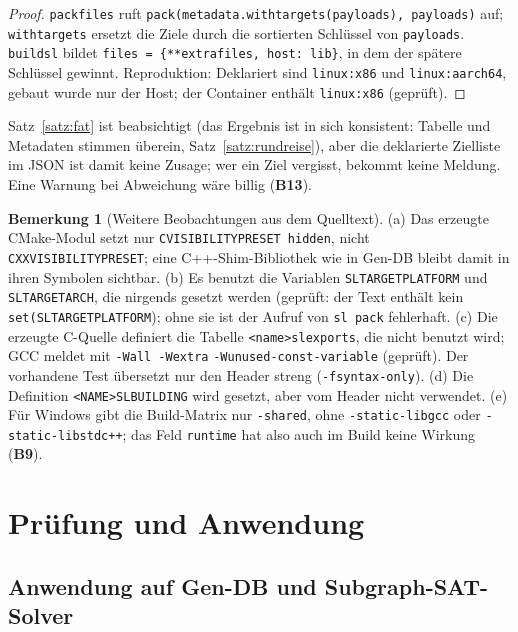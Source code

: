 \documentclass[a4paper,12pt,twoside]{report}
\DeclareRobustCommand{\_}{\ifmmode\mbox{\textunderscore}\else\textunderscore\allowbreak{}\fi}
\theoremstyle{definition}
\newtheorem{bemerkung}{Bemerkung}[chapter]
\newcommand{\Bf}[1]{\textbf{B#1}}
\begin{document}
\begin{proof}
	\texttt{pack\_files} ruft \texttt{pack(metadata.with\_targets(payloads), payloads)} auf; \texttt{with\_targets} ersetzt die Ziele durch die sortierten Schlüssel von \texttt{payloads}. \texttt{build\_sl} bildet \texttt{files = \{**extra\_files, host: lib\}}, in dem der spätere Schlüssel gewinnt. Reproduktion: Deklariert sind \texttt{linux:x86\_64} und \texttt{linux:aarch64}, gebaut wurde nur der Host; der Container enthält \texttt{linux:x86\_64} (geprüft).
\end{proof}

Satz~\ref{satz:fat} ist beabsichtigt (das Ergebnis ist in sich konsistent: Tabelle und Metadaten stimmen überein, Satz~\ref{satz:rundreise}), aber die deklarierte Zielliste im JSON ist damit keine Zusage; wer ein Ziel vergisst, bekommt keine Meldung. Eine Warnung bei Abweichung wäre billig (\Bf{13}).

\begin{bemerkung}[Weitere Beobachtungen aus dem Quelltext]
	\label{bem:cmake}
	(a) Das erzeugte CMake-Modul setzt nur \texttt{C\_VISIBILITY\_PRESET hidden}, nicht \texttt{CXX\_VISIBILITY\_PRESET}; eine C++-Shim-Bibliothek wie in Gen-DB bleibt damit in ihren Symbolen sichtbar. (b) Es benutzt die Variablen \texttt{SL\_TARGET\_PLATFORM} und \texttt{SL\_TARGET\_ARCH}, die nirgends gesetzt werden (geprüft: der Text enthält kein \texttt{set(SL\_TARGET\_PLATFORM}); ohne sie ist der Aufruf von \texttt{sl pack} fehlerhaft. (c) Die erzeugte C-Quelle definiert die Tabelle \texttt{<name>\_sl\_exports}, die nicht benutzt wird; GCC meldet mit \texttt{-Wall -Wextra} \texttt{-Wunused-const-variable} (geprüft). Der vorhandene Test übersetzt nur den Header streng (\texttt{-fsyntax-only}). (d) Die Definition \texttt{<NAME>\_SL\_BUILDING} wird gesetzt, aber vom Header nicht verwendet. (e) Für Windows gibt die Build-Matrix nur \texttt{-shared}, ohne \texttt{-static-libgcc} oder \texttt{-static-libstdc++}; das Feld \texttt{runtime} hat also auch im Build keine Wirkung (\Bf{9}).
\end{bemerkung}


\part{Prüfung und Anwendung}

\chapter{Anwendung auf Gen-DB und Subgraph-SAT-Solver}
\label{chap:anwendung}
\end{document}
